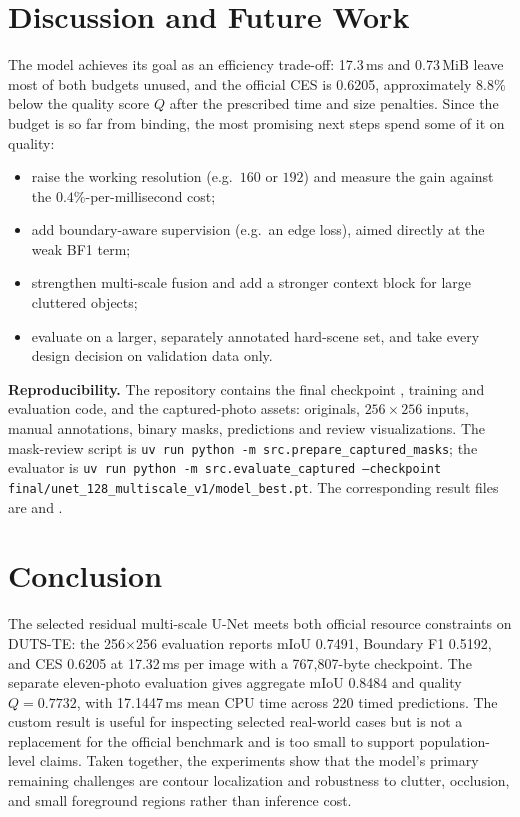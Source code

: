 \documentclass[10pt,a4paper,twocolumn]{article}
\begin{document}
\section{Discussion and Future Work}
The model achieves its goal as an efficiency trade-off: 17.3\,ms and 0.73\,MiB leave most of both budgets unused, and the official CES is 0.6205, approximately 8.8\% below the quality score $Q$ after the prescribed time and size penalties. Since the budget is so far from binding, the most promising next steps spend some of it on quality:
\begin{itemize}
\item raise the working resolution (e.g.\ $160$ or $192$) and measure the gain against the $0.4\%$-per-millisecond cost;
\item add boundary-aware supervision (e.g.\ an edge loss), aimed directly at the weak BF1 term;
\item strengthen multi-scale fusion and add a stronger context block for large cluttered objects;
\item evaluate on a larger, separately annotated hard-scene set, and take every design decision on validation data only.
\end{itemize}

\textbf{Reproducibility.} The repository contains the final checkpoint , training and evaluation code, and the captured-photo assets: originals, $256{\times}256$ inputs, manual annotations, binary masks, predictions and review visualizations. The mask-review script is \texttt{uv run python -m src.prepare\_captured\_masks}; the evaluator is \texttt{uv run python -m src.evaluate\_captured --checkpoint final/unet\_128\_multiscale\_v1/model\_best.pt}. The corresponding result files are  and .


\section{Conclusion}
The selected residual multi-scale U-Net meets both official resource constraints on DUTS-TE: the 256$\times$256 evaluation reports mIoU 0.7491, Boundary F1 0.5192, and CES 0.6205 at 17.32\,ms per image with a 767{,}807-byte checkpoint. The separate eleven-photo evaluation gives aggregate mIoU 0.8484 and quality $Q=0.7732$, with 17.1447\,ms mean CPU time across 220 timed predictions. The custom result is useful for inspecting selected real-world cases but is not a replacement for the official benchmark and is too small to support population-level claims. Taken together, the experiments show that the model's primary remaining challenges are contour localization and robustness to clutter, occlusion, and small foreground regions rather than inference cost.
\end{document}
